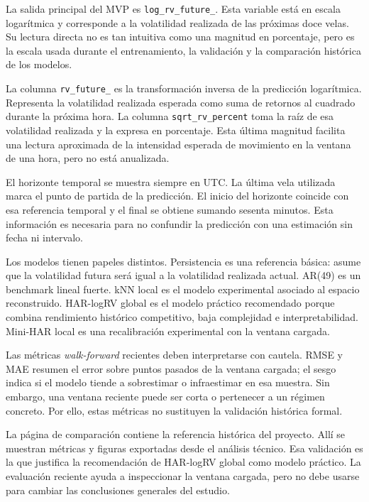 La salida principal del MVP es \texttt{log\_\allowbreak rv\_\allowbreak future\_}. Esta variable está en escala logarítmica y corresponde a la volatilidad realizada de las próximas doce velas. Su lectura directa no es tan intuitiva como una magnitud en porcentaje, pero es la escala usada durante el entrenamiento, la validación y la comparación histórica de los modelos.

La columna \texttt{rv\_\allowbreak future\_} es la transformación inversa de la predicción logarítmica. Representa la volatilidad realizada esperada como suma de retornos al cuadrado durante la próxima hora. La columna \texttt{sqrt\_\allowbreak rv\_\allowbreak percent} toma la raíz de esa volatilidad realizada y la expresa en porcentaje. Esta última magnitud facilita una lectura aproximada de la intensidad esperada de movimiento en la ventana de una hora, pero no está anualizada.

El horizonte temporal se muestra siempre en UTC. La última vela utilizada marca el punto de partida de la predicción. El inicio del horizonte coincide con esa referencia temporal y el final se obtiene sumando sesenta minutos. Esta información es necesaria para no confundir la predicción con una estimación sin fecha ni intervalo.

Los modelos tienen papeles distintos. Persistencia es una referencia básica: asume que la volatilidad futura será igual a la volatilidad realizada actual. AR(49) es un benchmark lineal fuerte. kNN local es el modelo experimental asociado al espacio reconstruido. HAR-logRV global es el modelo práctico recomendado porque combina rendimiento histórico competitivo, baja complejidad e interpretabilidad. Mini-HAR local es una recalibración experimental con la ventana cargada.

Las métricas \textit{walk-forward} recientes deben interpretarse con cautela. RMSE y MAE resumen el error sobre puntos pasados de la ventana cargada; el sesgo indica si el modelo tiende a sobrestimar o infraestimar en esa muestra. Sin embargo, una ventana reciente puede ser corta o pertenecer a un régimen concreto. Por ello, estas métricas no sustituyen la validación histórica formal.

La página de comparación contiene la referencia histórica del proyecto. Allí se muestran métricas y figuras exportadas desde el análisis técnico. Esa validación es la que justifica la recomendación de HAR-logRV global como modelo práctico. La evaluación reciente ayuda a inspeccionar la ventana cargada, pero no debe usarse para cambiar las conclusiones generales del estudio.

